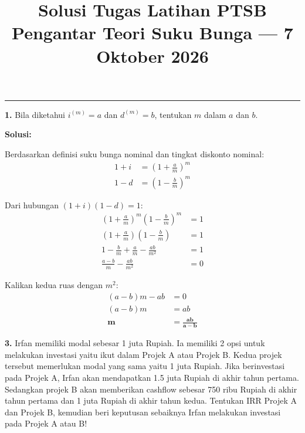 \documentclass[11pt,a4paper]{article}
\title{\vspace{-1.5cm}\textbf{Solusi Tugas Latihan PTSB}\\\large Pengantar Teori Suku Bunga --- 7 Oktober 2026\vspace{-0.8cm}}
\author{}
\date{}
\begin{document}
\maketitle

\vspace{-0.5em}
\hrule
\vspace{0.8em}

\begin{tcolorbox}
\textbf{1.} Bila diketahui $i^{(m)} = a$ dan $d^{(m)} = b$, tentukan $m$ dalam $a$ dan $b$.
\end{tcolorbox}

\textbf{Solusi:}

Berdasarkan definisi suku bunga nominal dan tingkat diskonto nominal:
\begin{align*}
    1 + i &= \left(1 + \frac{a}{m}\right)^m \\
    1 - d &= \left(1 - \frac{b}{m}\right)^m
\end{align*}

Dari hubungan $(1 + i)(1 - d) = 1$:
\begin{align*}
    \left(1 + \frac{a}{m}\right)^m \left(1 - \frac{b}{m}\right)^m &= 1 \\[0.3em]
    \left(1 + \frac{a}{m}\right)\left(1 - \frac{b}{m}\right) &= 1 \\[0.3em]
    1 - \frac{b}{m} + \frac{a}{m} - \frac{ab}{m^2} &= 1 \\[0.3em]
    \frac{a - b}{m} - \frac{ab}{m^2} &= 0
\end{align*}

Kalikan kedua ruas dengan $m^2$:
\begin{align*}
    (a - b)m - ab &= 0 \\[0.3em]
    (a - b)m &= ab \\[0.3em]
    \mathbf{m} &= \mathbf{\frac{ab}{a - b}}
\end{align*}

\vspace{0.5em}

\begin{tcolorbox}
\textbf{3.} Irfan memiliki modal sebesar 1 juta Rupiah. Ia memiliki 2 opsi untuk melakukan investasi yaitu ikut dalam Projek A atau Projek B. Kedua projek tersebut memerlukan modal yang sama yaitu 1 juta Rupiah. Jika berinvestasi pada Projek A, Irfan akan mendapatkan 1.5 juta Rupiah di akhir tahun pertama. Sedangkan projek B akan memberikan cashflow sebesar 750 ribu Rupiah di akhir tahun pertama dan 1 juta Rupiah di akhir tahun kedua. Tentukan IRR Projek A dan Projek B, kemudian beri keputusan sebaiknya Irfan melakukan investasi pada Projek A atau B!
\end{tcolorbox}
\end{document}
